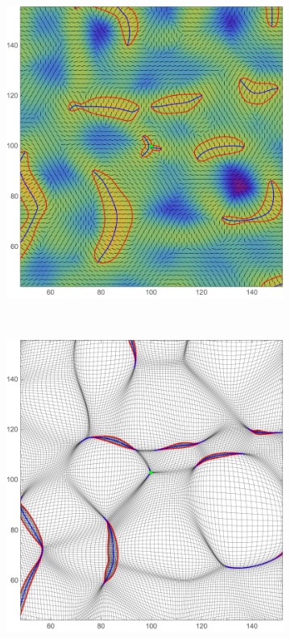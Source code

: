 \documentclass[a4paper, 11pt]{article}
\begin{document}
\begin{figure}
\begin{subfigure}[b]{0.3\textwidth}
\includegraphics[width=\textwidth]{Elliptic_L}
\end{subfigure}~
\begin{subfigure}[b]{0.3\textwidth}
\includegraphics[width=\textwidth]{Elliptic_Z}

\end{subfigure}
\end{figure}
\end{document}
